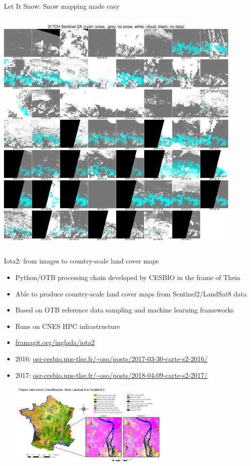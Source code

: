 \begin{frame}{Let It Snow: Snow mapping made easy}
\begin{columns}
\begin{center}
    \includegraphics[width=0.92\textwidth]{images/lis-series.png}
    \end{center}
  \end{columns}


\end{frame}

\begin{frame}{Iota2: from images to country-scale land cover maps}
  \begin{itemize}
    \item Python/OTB  processing chain developed by CESBIO in the frame of Theia
    \item Able to produce country-scale land cover maps from Sentinel2/LandSat8 data
    \item Based on OTB reference data sampling and machine learning frameworks
    \item Runs on CNES HPC infrastructure
    \item \url{framagit.org/inglada/iota2}
    \item 2016: \url{osr-cesbio.ups-tlse.fr/~oso/posts/2017-03-30-carte-s2-2016/}
    \item 2017: \url{osr-cesbio.ups-tlse.fr/~oso/posts/2018-04-09-carte-s2-2017/}
      \begin{center}
        \includegraphics[width=0.65\textwidth]{images/oso-2016.png}
        \end{center}
  \end{itemize}
      
\end{frame}

